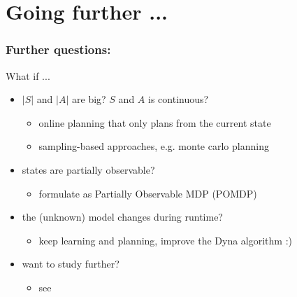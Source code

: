 \section{Going further ...}

\begin{frame}
\frametitle{Further questions:}
What if ...
\pause

\begin{itemize}
  \item $|S|$ and $|A|$ are big? $S$ and $A$ is continuous? \pause
  \begin{itemize}
    \item online planning that only plans from the current state
    \item sampling-based approaches, e.g. monte carlo planning
  \end{itemize}
  \pause

  \item states are partially observable? \pause
  \begin{itemize}
    \item formulate as Partially Observable MDP (POMDP)
  \end{itemize}
  \pause

  \item the (unknown) model changes during runtime? \pause
  \begin{itemize}
    \item keep learning and planning, improve the Dyna algorithm  :)
  \end{itemize}
  \pause

  \item want to study further? \pause
  \begin{itemize}
    \item see \cite{Sutton2017,Sugiyama2015,Poole2010,Russell2010,Szepesvari2010}
  \end{itemize}
\end{itemize}
\end{frame}